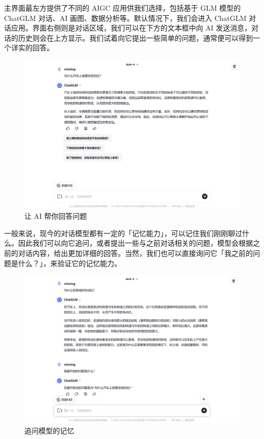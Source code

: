 主界面最左方提供了不同的 AIGC 应用供我们选择，包括基于 GLM 模型的 ChatGLM 对话、AI 画图、数据分析等。默认情况下，我们会进入 ChatGLM 对话应用。界面右侧则是对话区域，我们可以在下方的文本框中向 AI 发送消息，对话的历史则会在上方显示。我们试着向它提出一些简单的问题，通常便可以得到一个详实的回答。

\begin{figure}[htb!]
  \centering
  \includegraphics[width=.8\textwidth]{assets/surpass/Zhipu_q1.png}
  \caption{让 AI 帮你回答问题}
  \label{fig:Zhipu_q1}
\end{figure}

一般来说，现今的对话模型都有一定的「记忆能力」，可以记住我们刚刚聊过什么。因此我们可以向它追问，或者提出一些与之前对话相关的问题，模型会根据之前的对话内容，给出更加详细的回答。当然，我们也可以直接询问它「我之前的问题是什么？」，来验证它的记忆能力。

\begin{figure}[htb!]
  \centering
  \includegraphics[width=.8\textwidth]{assets/surpass/Zhipu_q2.png}
  \caption{追问模型的记忆}
  \label{fig:Zhipu_q2}
\end{figure}

